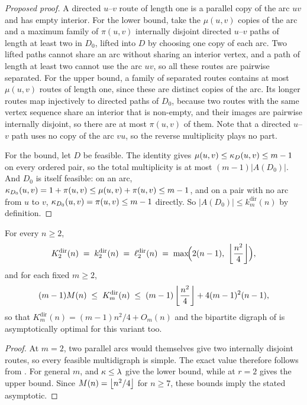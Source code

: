 \begin{proof}[Proposed proof]
A directed $u$--$v$ route of length one is a parallel copy of the arc $uv$ and has empty
interior. For the lower bound, take the $\mu(u,v)$ copies of the arc and a maximum
family of $\pi(u,v)$ internally disjoint directed $u$--$v$ paths of length at least two
in $D_0$, lifted into $D$ by choosing one copy of each arc. Two lifted paths cannot share
an arc without sharing an interior vertex, and a path of length at least two cannot use
the arc $uv$, so all these routes are pairwise separated. For the upper bound, a family
of separated routes contains at most $\mu(u,v)$ routes of length one, since these are
distinct copies of the arc. Its longer routes map injectively to directed paths of $D_0$,
because two routes with the same vertex sequence share an interior that is non-empty,
and their images are pairwise internally disjoint, so there are at most $\pi(u,v)$ of
them. Note that a
directed $u$--$v$ path uses no copy of the arc $vu$, so the reverse multiplicity plays
no part.

For the bound, let $D$ be feasible. The identity gives $\mu(u,v) \le \kappa_D(u,v) \le m-1$
on every ordered pair, so the total multiplicity is at most $(m-1)|A(D_0)|$. And $D_0$
is itself feasible: on an arc, $\kappa_{D_0}(u,v) = 1 + \pi(u,v) \le \mu(u,v) + \pi(u,v)
\le m-1$, and on a pair with no arc from $u$ to $v$, $\kappa_{D_0}(u,v) = \pi(u,v) \le m-1$
directly. So $|A(D_0)| \le k_m^{\mathrm{dir}}(n)$ by definition.
\end{proof}

\begin{corollary}\label{cor:dir-multi-incidence}
For every $n \ge 2$,
\[
    K_2^{\mathrm{dir}}(n) \;=\; k_2^{\mathrm{dir}}(n) \;=\; \ell_2^{\mathrm{dir}}(n)
    \;=\; \max\!\Bigl(2(n-1),\ \left\lfloor \frac{n^2}{4} \right\rfloor\Bigr) ,
\]
and for each fixed $m \ge 2$,
\[
    (m-1)M(n) \;\le\; K_m^{\mathrm{dir}}(n)
    \;\le\; (m-1)\left\lfloor \frac{n^2}{4} \right\rfloor + 4(m-1)^2(n-1) ,
\]
so that $K_m^{\mathrm{dir}}(n) = (m-1)n^2/4 + O_m(n)$ and the bipartite digraph of
 is asymptotically optimal for this variant too.
\end{corollary}

\begin{proof}
At $m=2$, two parallel arcs would themselves give two internally disjoint
routes, so every feasible multidigraph is simple. The exact value therefore
follows from .
For general $m$,  and $\kappa\le\lambda$ give the lower
bound, while  at $r=2$ gives the upper bound.
Since $M(n)=\left\lfloor n^2/4 \right\rfloor$ for $n\ge7$, these bounds imply the stated asymptotic.
\end{proof}

